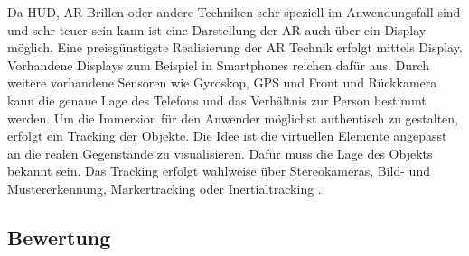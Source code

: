 \documentclass[12pt,a4paper,bibliography=totocnumbered,listof=totocnumbered]{scrartcl}
\begin{document}
Da HUD, AR-Brillen oder andere Techniken sehr speziell im Anwendungsfall sind und sehr teuer sein kann ist eine Darstellung der AR auch über ein Display möglich. Eine preisgünstigste Realisierung der AR Technik erfolgt mittels Display. Vorhandene Displays zum Beispiel in Smartphones reichen dafür aus. Durch weitere vorhandene Sensoren wie Gyroskop, GPS und Front und Rückkamera kann die genaue Lage des Telefons und das Verhältnis zur Person bestimmt werden.\newline
Um die Immersion für den Anwender möglichst authentisch zu gestalten, erfolgt ein Tracking der Objekte. Die Idee ist die virtuellen Elemente angepasst an die realen Gegenstände zu visualisieren. Dafür muss die Lage des Objekts bekannt sein. Das Tracking erfolgt wahlweise über Stereokameras, Bild- und Mustererkennung, Markertracking oder Inertialtracking \cite{Tonnis:2010aa}.
\subsection{Bewertung}
\end{document}
